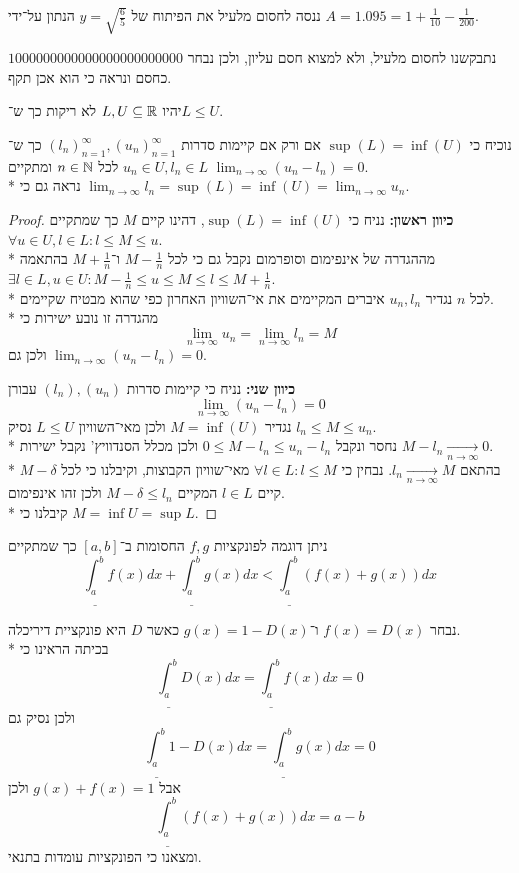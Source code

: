 \Subquestion{}
ננסה לחסום מלעיל את הפיתוח של $y = \sqrt{\frac{6}{5}}$ הנתון על־ידי $A = 1.095 = 1 + \frac{1}{10} - \frac{1}{200}$.

נתבקשנו לחסום מלעיל, ולא למצוא חסם עליון, ולכן נבחר $1000000000000000000000000$ כחסם ונראה כי הוא אכן תקף.

\Question{}
יהיו $L, U \subseteq \mathbb{R}$ לא ריקות כך ש־$L \le U$.

\Subquestion{}
נוכיח כי $\sup(L) = \inf(U)$ אם ורק אם קיימות סדרות ${(l_n)}_{n = 1}^\infty, {(u_n)}_{n = 1}^\infty$ כך ש־$u_n \in U, l_n \in L$ לכל $n \in \mathbb{N}$ ומתקיים $\lim_{n \to \infty} (u_n - l_n) = 0$. \\*
נראה גם כי $\lim_{n \to \infty} l_n = \sup(L) = \inf(U) = \lim_{n \to \infty} u_n$.
\begin{proof}
	\textbf{כיוון ראשון:}
	נניח כי $\sup(L) = \inf(U)$, דהינו קיים $M$ כך שמתקיים $\forall u \in U, l \in L : l \le M \le u$. \\*
	מההגדרה של אינפימום וסופרמום נקבל גם כי לכל $M - \frac{1}{n}$ ו־$M + \frac{1}{n}$ בהתאמה $\exists l \in L, u \in U : M - \frac{1}{n} \le u \le M \le l \le M + \frac{1}{n}$. \\*
	לכל $n$ נגדיר $u_n, l_n$ איברים המקיימים את אי־השוויון האחרון כפי שהוא מבטיח שקיימים. \\*
	מהגדרה זו נובע ישירות כי
	\[
		\lim_{n \to \infty} u_n = \lim_{n \to \infty} l_n = M
	\]
	ולכן גם $\lim_{n \to \infty} (u_n - l_n) = 0$.

	\textbf{כיוון שני:}
	נניח כי קיימות סדרות $(l_n), (u_n)$ עבורן
	\[
		\lim_{n \to \infty} (u_n - l_n) = 0
	\]
	נגדיר $M = \inf(U)$ ולכן מאי־השוויון $L \le U$ נסיק $l_n \le M \le u_n$. \\*
	נחסר ונקבל $0 \le M - l_n \le u_n - l_n$ ולכן מכלל הסנדוויץ' נקבל ישירות $M - l_n \xrightarrow[n \to \infty]{} 0$. \\*
	בהתאם $l_n \xrightarrow[n \to \infty]{} M$. נבחין כי $\forall l \in L : l \le M$ מאי־שוויון הקבוצות, וקיבלנו כי לכל $M - \delta$ קיים $l \in L$ המקיים $M - \delta \le l_n$ ולכן זהו אינפימום. \\*
	קיבלנו כי $M = \inf U = \sup L$.
\end{proof}

\Question{}
ניתן דוגמה לפונקציות $f, g$ החסומות ב־$[a, b]$ כך שמתקיים
\[
	\underline{\int_{a}^{b}} f(x)dx
	+ \underline{\int_{a}^{b}} g(x)dx
	< \underline{\int_{a}^{b}} (f(x) + g(x))dx
\]

נבחר $f(x) = D(x)$ ו־$g(x) = 1 - D(x)$ כאשר $D$ היא פונקציית דיריכלה. \\*
בכיתה הראינו כי
\[
	\underline{\int_{a}^{b}} D(x)dx
	= \underline{\int_{a}^{b}} f(x)dx
	= 0
\]
ולכן נסיק גם
\[
	\underline{\int_{a}^{b}} 1 - D(x)dx
	= \underline{\int_{a}^{b}} g(x)dx
	= 0
\]
אבל $g(x) + f(x) = 1$ ולכן
\[
	\underline{\int_{a}^{b}} (f(x) + g(x))dx = a - b
\]
ומצאנו כי הפונקציות עומדות בתנאי.

